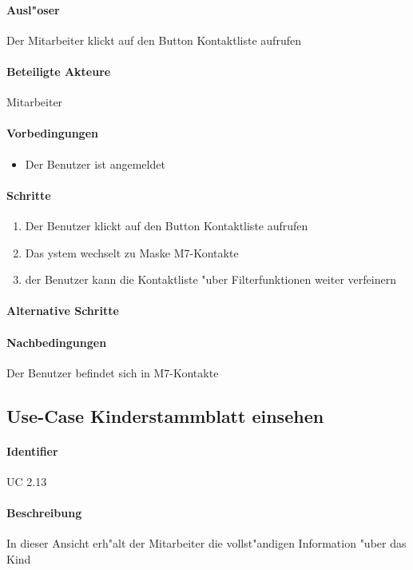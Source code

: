   \paragraph{Ausl"oser}
  Der Mitarbeiter klickt auf den Button \dq Kontaktliste aufrufen\dq
  \paragraph{Beteiligte Akteure}   \leavevmode \newline
    Mitarbeiter
  \paragraph{Vorbedingungen}
  \begin{itemize}
   \item Der Benutzer ist angemeldet
  \end{itemize}

  \paragraph{Schritte}
  \begin{enumerate}
   \item Der Benutzer klickt auf den Button \dq Kontaktliste aufrufen\dq
   \item Das ystem wechselt zu Maske M7-Kontakte
   \item der Benutzer kann die Kontaktliste "uber Filterfunktionen weiter verfeinern
  \end{enumerate}

  \paragraph{Alternative Schritte}
  \paragraph{Nachbedingungen}
  Der Benutzer befindet sich in M7-Kontakte
  
  \newpage
 \subsection{Use-Case Kinderstammblatt einsehen }
  \paragraph{Identifier}
  UC 2.13
  \paragraph{Beschreibung}
  In dieser Ansicht erh"alt der Mitarbeiter die vollst"andigen Information "uber das Kind
